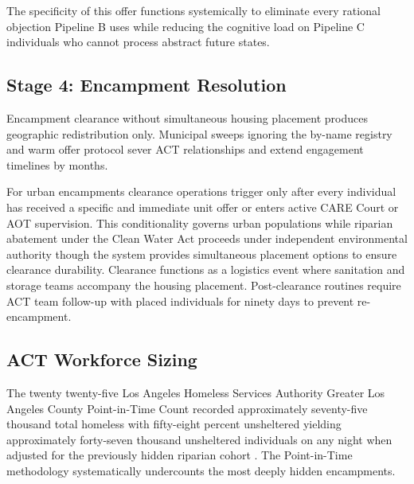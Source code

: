 \documentclass[12pt, letterpaper]{article}
\begin{document}
The specificity of this offer functions systemically to eliminate every rational objection Pipeline B uses while reducing the cognitive load on Pipeline C individuals who cannot process abstract future states.

\subsection{Stage 4: Encampment Resolution}

Encampment clearance without simultaneous housing placement produces geographic redistribution only. Municipal sweeps ignoring the by-name registry and warm offer protocol sever ACT relationships and extend engagement timelines by months.

For urban encampments clearance operations trigger only after every individual has received a specific and immediate unit offer or enters active CARE Court or AOT supervision. This conditionality governs urban populations while riparian abatement under the Clean Water Act proceeds under independent environmental authority though the system provides simultaneous placement options to ensure clearance durability. Clearance functions as a logistics event where sanitation and storage teams accompany the housing placement. Post-clearance routines require ACT team follow-up with placed individuals for ninety days to prevent re-encampment.

\subsection{ACT Workforce Sizing}

The twenty twenty-five Los Angeles Homeless Services Authority Greater Los Angeles County Point-in-Time Count recorded approximately seventy-five thousand total homeless with fifty-eight percent unsheltered yielding approximately forty-seven thousand unsheltered individuals on any night when adjusted for the previously hidden riparian cohort \citep{lahsa_count_2025}. The Point-in-Time methodology systematically undercounts the most deeply hidden encampments.
\end{document}
